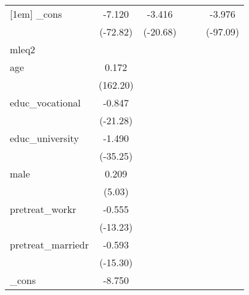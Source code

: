 {\begin{tabular}{l*{5}{c}}
[1em]
\_cons      &      -7.120\sym{***}&      -3.416\sym{***}&                     &                     &      -3.976\sym{***}\\
            &    (-72.82)         &    (-20.68)         &                     &                     &    (-97.09)         \\
\hline
mleq2       &                     &                     &                     &                     &                     \\
age         &       0.172\sym{***}&                     &                     &                     &                     \\
            &    (162.20)         &                     &                     &                     &                     \\
[1em]
educ\_vocational&      -0.847\sym{***}&                     &                     &                     &                     \\
            &    (-21.28)         &                     &                     &                     &                     \\
[1em]
educ\_university&      -1.490\sym{***}&                     &                     &                     &                     \\
            &    (-35.25)         &                     &                     &                     &                     \\
[1em]
male        &       0.209\sym{***}&                     &                     &                     &                     \\
            &      (5.03)         &                     &                     &                     &                     \\
[1em]
pretreat\_workr&      -0.555\sym{***}&                     &                     &                     &                     \\
            &    (-13.23)         &                     &                     &                     &                     \\
[1em]
pretreat\_marriedr&      -0.593\sym{***}&                     &                     &                     &                     \\
            &    (-15.30)         &                     &                     &                     &                     \\
[1em]
\_cons      &      -8.750\sym{***}&                     &                     &                     &                     \\

\end{tabular}}
